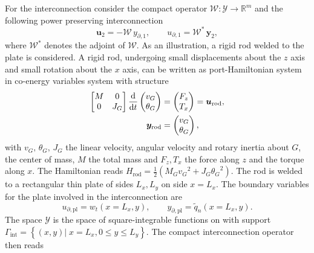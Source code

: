 \documentclass[letterpaper, 10 pt, conference]{ieeeconf}
\begin{document}
For the interconnection consider the compact operator $\mathcal{W}: \mathscr{Y} \rightarrow \mathbb{R}^m$ and the following power preserving interconnection
\begin{equation}
\label{eq:int_inf}
\bm{u}_2 = -\mathcal{W} \, y_{\partial, 1},  \qquad u_{\partial, 1} = \mathcal{W}^* \, \bm{y}_2,
\end{equation}
where $\mathcal{W}^*$ denotes the adjoint of $\mathcal{W}$. As an illustration, a rigid rod welded to the plate is considered. A rigid rod, undergoing small displacements about the $z$ axis and small rotation about the $x$ axis, can be written as port-Hamiltonian system in co-energy variables system with structure
\begin{equation}
\begin{aligned}
\begin{bmatrix}
M & 0 \\
0   & J_G \\
\end{bmatrix} 
\displaystyle \diff{}{t}
\begin{pmatrix}
v_G \\ \theta_G \\
\end{pmatrix} & = \begin{pmatrix}
F_z \\ T_x \\
\end{pmatrix} = \bm{u}_{\text{rod}}\vspace{1mm}, \\
\bm{y}_{\text{rod}} &= \begin{pmatrix}
v_G \\ \theta_{G} \\
\end{pmatrix},
\end{aligned}
\end{equation}
with $v_G, \, \theta_{G}, \, J_G$ the linear velocity, angular velocity and rotary inertia about $G$, the center of mass, $M$ the total mass  and $F_z, T_x$ the force along $z$ and the torque along $x$. The Hamiltonian reads $H_{\text{rod}}  = \frac{1}{2} \left(M_G {v_G}^2 + J_G {\theta_G}^2 \right)$. The rod is welded to a rectangular thin plate of sides $L_x, L_y$ on side $x = L_x$. The boundary variables for the plate involved in the interconnection are 
\[u_{\partial, \text{pl}} = w_t(x = L_x, y),  \qquad  y_{\partial, \text{pl}} = \widetilde{q}_n(x = L_x, y).
\]
The space $\mathscr{Y}$ is the space of square-integrable functions on with support $\Gamma_{\text{int}} = \left\{ (x,y) \vert \; x=L_x, 0 \le y \le L_y  \right\}$. The compact interconnection operator then reads
\end{document}
